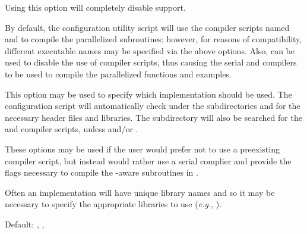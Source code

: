 \begin{config}
  
\item {}

  Using this option will completely disable {\mpi} support.

\item {}
\item {}

  By default, the configuration utility script will use the {\mpi} compiler
  scripts named  and  to compile the parallelized
  {\sundials} subroutines; however, for reasons of compatibility, different
  executable names may be specified via the above options. Also, 
  can be used to disable the use of {\mpi} compiler scripts, thus causing
  the serial {\C} and {\F} compilers to be used to compile the parallelized
  {\sundials} functions and examples.

\item {}

  This option may be used to specify which {\mpi} implementation should be used.
  The {\sundials} configuration script will automatically check under the
  subdirectories  and  for the necessary
  header files and libraries. The subdirectory  will also be
  searched for the {\C} and {\F} {\mpi} compiler scripts, unless
   and/or .

\item {}
\item {}
\item {}

  These options may be used if the user would prefer not to use a preexisting
  {\mpi} compiler script, but instead would rather use a serial complier and
  provide the flags necessary to compile the {\mpi}-aware subroutines in
  {\sundials}.

  Often an {\mpi} implementation will have unique library names and so it may
  be necessary to specify the appropriate libraries to use ({\em e.g.},
  ).

  Default: , , 

\end{config}



